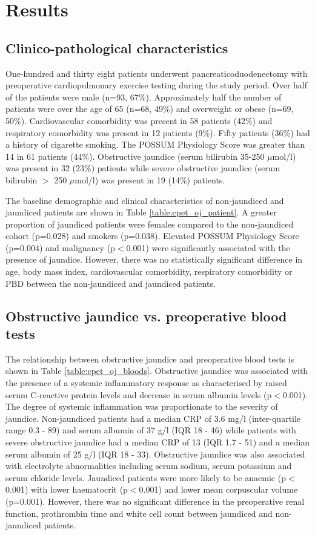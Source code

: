 \clearpage

\section{Results}

\subsection{Clinico-pathological characteristics}
One-hundred and thirty eight patients underwent pancreaticoduodenectomy with preoperative cardiopulmonary exercise testing during the study period. 
Over half of the patients were male (n=93, 67\%). 
Approximately half the number of patients were over the age of 65 (n=68, 49\%) and overweight or obese (n=69, 50\%). 
Cardiovascular comorbidity was present in 58 patients (42\%) and respiratory comorbidity was present in 12 patients (9\%). 
Fifty patients (36\%) had a history of cigarette smoking. 
The POSSUM Physiology Score was greater than 14 in 61 patients (44\%). 
Obstructive jaundice (serum bilirubin 35-250 $\mu$mol/l) was present in 32 (23\%) patients while severe obstructive jaundice (serum bilirubin $>$ 250 $\mu$mol/l) was present in 19 (14\%) patients. 

The baseline demographic and clinical characteristics of non-jaundiced and jaundiced patients are shown in Table \ref{table:cpet_oj_patient}. 
A greater proportion of jaundiced patients were females compared to the non-jaundiced cohort (p=0.028) and smokers (p=0.038). 
Elevated POSSUM Physiology Score (p=0.004) and malignancy (p$<$0.001) were significantly associated with the presence of jaundice. 
However, there was no statistically significant difference in age, body mass index, cardiovascular comorbidity, respiratory comorbidity or PBD between the non-jaundiced and jaundiced patients.



\subsection{Obstructive jaundice vs. preoperative blood tests}
The relationship between obstructive jaundice and preoperative blood tests is shown in Table \ref{table:cpet_oj_bloods}. 
Obstructive jaundice was associated with the presence of a systemic inflammatory response as characterised by raised serum C-reactive protein levels and decrease in serum albumin levels (p$<$0.001). 
The degree of systemic inflammation was proportionate to the severity of jaundice. 
Non-jaundiced patients had a median CRP of 3.6 mg/l (inter-quartile range 0.3 - 89) and serum albumin of 37 g/l (IQR 18 - 46) while patients with severe obstructive jaundice had a median CRP of 13 (IQR 1.7 - 51) and a median serum albumin of 25 g/l (IQR 18 - 33). 
Obstructive jaundice was also associated with electrolyte abnormalities including serum sodium, serum potassium and serum chloride levels. 
Jaundiced patients were more likely to be anaemic (p$<$0.001) with lower haematocrit (p$<$0.001) and lower mean corpuscular volume (p=0.001). 
However, there was no significant difference in the preoperative renal function, prothrombin time and white cell count between jaundiced and non-jaundiced patients. 


